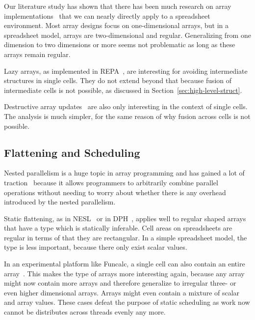 \documentclass[a4paper]{article}
\begin{document}
Our literature study has shown that there has been much research on array implementations~\cite{47507, Keller:2010:RSP:1863543.1863582, Stucki:2015:RVP:2784731.2784739} that we can nearly directly apply to a spreadsheet environment. Most array designs focus on one-dimensional arrays, but in a spreadsheet model, arrays are two-dimensional and regular. Generalizing from one dimension to two dimensions or more seems not problematic as long as these arrays remain regular.

Lazy arrays, as implemented in REPA~\cite{Keller:2010:RSP:1863543.1863582}, are interesting for avoiding intermediate structures in single cells. They do not extend beyond that because fusion of intermediate cells is not possible, as discussed in Section~\ref{sec:high-level-struct}.

Destructive array updates~\cite{Sastry:1994:PDU:182409.182486} are also only interesting in the context of single cells. The analysis is much simpler, for the same reason of why fusion across cells is not possible.

\subsection{Flattening and Scheduling}
\label{sec:scheduling}

Nested parallelism is a huge topic in array programming and has gained a lot of traction~\cite{Blelloch1993Implementation, Lippmeier:2012:WEH:2364527.2364564, Collins:2014:NFL:2627373.2627375} because it allows programmers to arbitrarily combine parallel operations without needing to worry about whether there is any overhead introduced by the nested parallelism.

Static flattening, as in NESL~\cite{Blelloch1993Implementation} or in DPH~\cite{Lippmeier:2012:WEH:2364527.2364564}, applies well to regular shaped arrays that have a type which is statically inferable. Cell areas on spreadsheets are regular in terms of that they are rectangular. In a simple spreadsheet model, the type is less important, because there only exist scalar values.

In an experimental platform like Funcalc, a single cell can also contain an entire array~\cite{Jones:2003:UAF:944705.944721, Sestoft2014Spreadsheet}. This makes the type of arrays more interesting again, because any array might now contain more arrays and therefore generalize to irregular three- or even higher dimensional arrays. Arrays might even contain a mixture of scalar and array values. These cases defeat the purpose of static scheduling as work now cannot be distributes across threads evenly any more.
\end{document}
